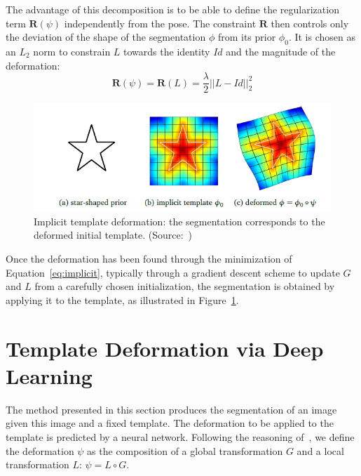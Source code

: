 The advantage of this decomposition is to be able to define the regularization term $\mathbf{R} \left( \psi \right)$  independently from the pose. The constraint $\mathbf{R}$ then controls only the deviation of the shape of the segmentation $\phi$ from its prior $\phi_0$. It is chosen as an $L_2$ norm to constrain $L$ towards the identity $Id$ and the magnitude of the deformation:
\begin{equation}
    \mathbf{R} \left( \psi \right) = \mathbf{R} \left( L \right) = \frac{\lambda}{2} || L - Id ||^2_2
\end{equation}

\begin{figure}[htbp]
	\includegraphics[width=\textwidth]{img_seg/implicit}
    \caption[Implicit template deformation]{Implicit template deformation: the segmentation corresponds to the deformed initial template. (Source:~\textcite{mory2011})}
    \label{fig:implicit}
\end{figure}

Once the deformation has been found through the minimization of Equation~\ref{eq:implicit}, typically through a gradient descent scheme to update $G$ and $L$ from a carefully chosen initialization, the segmentation is obtained by applying it to the template, as illustrated in Figure~\ref{fig:implicit}.

\section{Template Deformation via Deep Learning}
\label{sec:deformable_dl}

The method presented in this section produces the segmentation of an image given this image and a fixed template. The deformation to be applied to the template is predicted by a neural network. Following the reasoning of~\textcite{mory2012MICCAI}, we define the deformation $\psi$ as the composition of a global transformation $G$ and a local transformation $L$: $\psi = L \circ G$.

